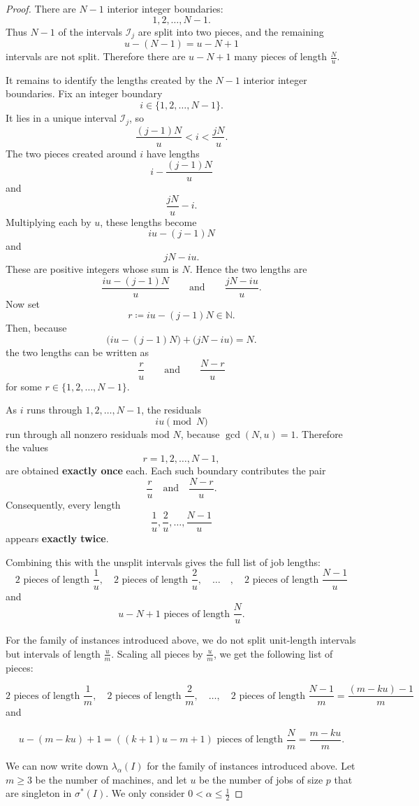\documentclass[%
english, titlepage=false %
]{./tum-templates/book/tumbook}
\begin{document}
\begin{proof}
There are \(N-1\) interior integer boundaries:
\[
1,2,\ldots,N-1.
\]
Thus \(N-1\) of the intervals \(\mathcal{I}_j\) are split into two pieces, and the remaining
\[
u-(N-1)=u-N+1
\]
intervals are not split. Therefore there are $u-N+1$ many
pieces of length $\frac{N}{u}$.

It remains to identify the lengths created by the $N-1$ interior integer boundaries. Fix an integer boundary
\[
i\in\{1,2,\ldots,N-1\}.
\]
It lies in a unique interval \(\mathcal{I}_j\), so
\[
\frac{(j-1)N}{u}<i<\frac{jN}{u}.
\]
The two pieces created around \(i\) have lengths
\[
i-\frac{(j-1)N}{u}
\]
and
\[
\frac{jN}{u}-i.
\]
Multiplying each by \(u\), these lengths become
\[
iu-(j-1)N
\]
and
\[
jN-iu.
\]
These are positive integers whose sum is \(N\). Hence the two lengths are
\[
\frac{iu-(j-1)N}{u}
\qquad\text{and}\qquad
\frac{jN-iu}{u}.
\]
Now set
\[
r \coloneqq iu-(j-1)N \in \mathbb{N}.
\]
Then, because
\[
\bigl(iu-(j-1)N\bigr)+\bigl(jN-iu\bigr)=N.
\]
the two lengths can be written as
\[
\frac{r}{u}
\qquad\text{and}\qquad
\frac{N-r}{u}
\]
for some \(r\in\{1,2,\ldots,N-1\}\).

As \(i\) runs through \(1,2,\ldots,N-1\), the residuals
\[
iu \pmod N
\]
run through all nonzero residuals mod \(N\), because \(\gcd(N,u)=1\). 
Therefore the values 
\[
 r = 1,2,\ldots,N-1,
\]
are obtained \textbf{exactly once} each. Each such boundary contributes the pair
\[
\frac{r}{u}
\quad\text{and}\quad
\frac{N-r}{u}.
\]
Consequently, every length
\[
\frac{1}{u},\frac{2}{u},\ldots,\frac{N-1}{u}
\]
appears \textbf{exactly twice}.

Combining this with the unsplit intervals gives the full list of job lengths:
\[
2 \text{ pieces of length } \frac{1}{u},
\quad
2 \text{ pieces of length } \frac{2}{u},
\quad
\ldots \quad ,
\quad
2 \text{ pieces of length } \frac{N-1}{u}
\]
and
\[
u-N+1 \text{ pieces of length } \frac{N}{u}.
\]


For the family of instances introduced above, we do not split unit-length intervals but intervals of length $\frac{u}{m}$.
Scaling all pieces by $\frac{u}{m}$, we get the following list of pieces:

\[
2 \text{ pieces of length } \frac{1}{m},
\quad
2 \text{ pieces of length } \frac{2}{m},
\quad
\ldots,
\quad
2 \text{ pieces of length } \frac{N-1}{m}=\frac{(m-ku)-1}{m}
\]
and

\[
u-(m-ku)+1=((k+1)u-m+1) \text{ pieces of length }  \frac{N}{m}=\frac{m-ku}{m}.
\]


We can now write down $\lambda_{\alpha}(I)$ for the family of instances introduced 
above. Let $m \ge 3$ be the number of machines, and let \(u\) be the number of jobs 
of size \(p\) that are singleton in \(\sigma^{*}(I)\). We only consider
$ 0 < \alpha \leq \frac12$


\end{proof}
\end{document}
